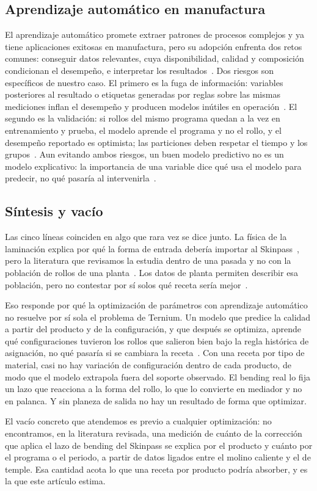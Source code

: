 \subsection{Aprendizaje automático en manufactura}
El aprendizaje automático promete extraer patrones de procesos complejos y ya tiene aplicaciones exitosas en
manufactura, pero su adopción enfrenta dos retos comunes: conseguir datos relevantes, cuya disponibilidad, calidad y
composición condicionan el desempeño, e interpretar los resultados~\cite{wuest2016}. Dos riesgos son específicos de nuestro caso. El primero es la fuga de
información: variables posteriores al resultado o etiquetas generadas por reglas sobre las mismas mediciones inflan
el desempeño y producen modelos inútiles en operación~\cite{kaufman2012,kapoor2023}. El segundo es la validación: si
rollos del mismo programa quedan a la vez en entrenamiento y prueba, el modelo aprende el programa y no el rollo, y
el desempeño reportado es optimista; las particiones deben respetar el tiempo y los grupos~\cite{roberts2017}. Aun
evitando ambos riesgos, un buen modelo predictivo no es un modelo explicativo: la importancia de una variable dice
qué usa el modelo para predecir, no qué pasaría al intervenirla~\cite{shmueli2010}.

\subsection{Síntesis y vacío}
\label{sec:vacio}
Las cinco líneas coinciden en algo que rara vez se dice junto. La física de la laminación explica por qué la forma
de entrada debería importar al Skinpass~\cite{lenard2014}, pero la literatura que revisamos la estudia dentro de una
pasada y no con la población de rollos de una planta~\cite{kijima2008}. Los datos de planta permiten describir esa
población, pero no contestar por sí solos qué receta sería mejor~\cite{box1966,hernan2019}.

Eso responde por qué la optimización de parámetros con aprendizaje automático no resuelve por sí sola el problema de
Ternium. Un modelo que predice la calidad a partir del producto y de la configuración, y que después se optimiza,
aprende qué configuraciones tuvieron los rollos que salieron bien bajo la regla histórica de asignación, no qué pasaría
si se cambiara la receta~\cite{hernan2019,shmueli2010}. Con una receta por tipo de material, casi no hay variación de
configuración dentro de cada producto, de modo que el modelo extrapola fuera del soporte observado. El bending real
lo fija un lazo que reacciona a la forma del rollo, lo que lo convierte en mediador y no en palanca. Y sin planeza de
salida no hay un resultado de forma que optimizar.

El vacío concreto que atendemos es previo a cualquier optimización: no encontramos, en la literatura revisada, una
medición de cuánto de la corrección que aplica el lazo de bending del Skinpass se explica por el producto y cuánto por
el programa o el periodo, a partir de datos ligados entre el molino caliente y el de temple. Esa cantidad acota lo que
una receta por producto podría absorber, y es la que este artículo estima.
